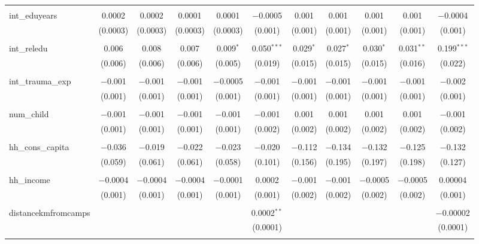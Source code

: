 \begin{table}[H]
\begin{tabular}{@{\extracolsep{4pt}}lcccccccccc}
  & & & & & & & & & & \\ 
 int\_eduyears & 0.0002 & 0.0002 & 0.0001 & 0.0001 & $-$0.0005 & 0.001 & 0.001 & 0.001 & 0.001 & $-$0.0004 \\ 
  & (0.0003) & (0.0003) & (0.0003) & (0.0003) & (0.001) & (0.001) & (0.001) & (0.001) & (0.001) & (0.001) \\ 
  & & & & & & & & & & \\ 
 int\_reledu & 0.006 & 0.008 & 0.007 & 0.009$^{*}$ & 0.050$^{***}$ & 0.029$^{*}$ & 0.027$^{*}$ & 0.030$^{*}$ & 0.031$^{**}$ & 0.199$^{***}$ \\ 
  & (0.006) & (0.006) & (0.006) & (0.005) & (0.019) & (0.015) & (0.015) & (0.015) & (0.016) & (0.022) \\ 
  & & & & & & & & & & \\ 
 int\_trauma\_exp & $-$0.001 & $-$0.001 & $-$0.001 & $-$0.0005 & $-$0.001 & $-$0.001 & $-$0.001 & $-$0.001 & $-$0.001 & $-$0.002 \\ 
  & (0.001) & (0.001) & (0.001) & (0.001) & (0.001) & (0.001) & (0.001) & (0.001) & (0.001) & (0.001) \\ 
  & & & & & & & & & & \\ 
 num\_child & $-$0.001 & $-$0.001 & $-$0.001 & $-$0.001 & $-$0.001 & 0.001 & 0.001 & 0.001 & 0.001 & $-$0.001 \\ 
  & (0.001) & (0.001) & (0.001) & (0.001) & (0.002) & (0.002) & (0.002) & (0.002) & (0.002) & (0.002) \\ 
  & & & & & & & & & & \\ 
 hh\_cons\_capita & $-$0.036 & $-$0.019 & $-$0.022 & $-$0.023 & $-$0.020 & $-$0.112 & $-$0.134 & $-$0.132 & $-$0.125 & $-$0.132 \\ 
  & (0.059) & (0.061) & (0.061) & (0.058) & (0.101) & (0.156) & (0.195) & (0.197) & (0.198) & (0.127) \\ 
  & & & & & & & & & & \\ 
 hh\_income & $-$0.0004 & $-$0.0004 & $-$0.0004 & $-$0.0001 & 0.0002 & $-$0.001 & $-$0.001 & $-$0.0005 & $-$0.0005 & 0.00004 \\ 
  & (0.001) & (0.001) & (0.001) & (0.001) & (0.001) & (0.002) & (0.002) & (0.002) & (0.002) & (0.001) \\ 
  & & & & & & & & & & \\ 
 distancekmfromcamps &  &  &  &  & 0.0002$^{**}$ &  &  &  &  & $-$0.00002 \\ 
  &  &  &  &  & (0.0001) &  &  &  &  & (0.0001) \\ 
  & & & & & & & & & & \\ 

\end{tabular}
\end{table}
